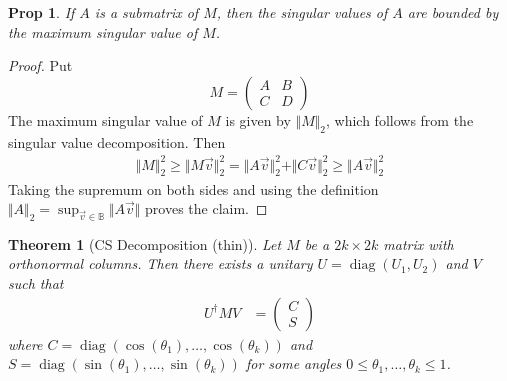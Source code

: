 \documentclass[11pt]{article}
\newtheorem{prop}{Prop}
\newtheorem{thm}{Theorem}
\newcommand{\diag}{\operatorname{diag}}
\begin{document}
\begin{prop}
If $A$ is a submatrix of $M$, then the singular values of $A$ are bounded by the maximum singular value of $M$.
\end{prop}
\begin{proof}
Put
$$
M = \begin{pmatrix}A & B \\ C & D\end{pmatrix}
$$
The maximum singular value of $M$ is given by $\Vert M \Vert_2$, which follows from the singular value decomposition. Then
\begin{align}
    \Vert M \Vert_2^2 \geq \Vert M \vec v\Vert_2^2 = \Vert A \vec v \Vert_2^2 + \Vert C \vec v \Vert_2^2 \geq \Vert A \vec v \Vert_2^2
\end{align}
Taking the supremum on both sides and using the definition $\Vert A \Vert_2 = \sup_{\vec v \in \mathbb B}\Vert A\vec v \Vert$ proves the claim.
\end{proof}

\begin{thm}[CS Decomposition (thin)]
Let $M$ be a $2k \times 2k$ matrix with orthonormal columns. Then there exists a unitary $U = \diag(U_1, U_2)$ and $V$ such that
\begin{align}
    U^\dagger M V &= \begin{pmatrix}C \\ S\end{pmatrix}
\end{align}
where $C = \diag(\cos(\theta_1), \dots, \cos(\theta_k))$ and $S = \diag(\sin(\theta_1), \dots, \sin(\theta_k))$ for some angles $0 \leq \theta_1, \dots, \theta_k \leq 1$. 
\end{thm}
\end{document}
